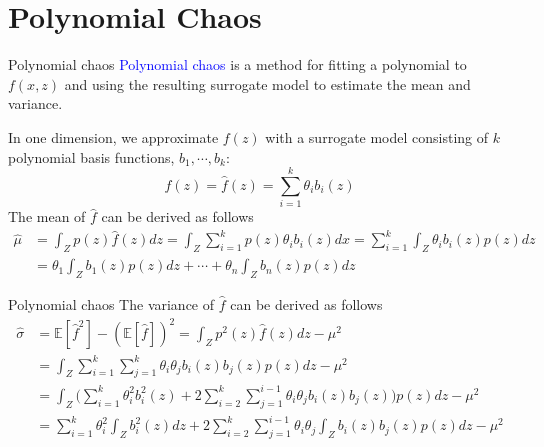 \documentclass{beamer}
\begin{document}
\section{Polynomial Chaos}
\begin{frame}{Polynomial chaos}
\textcolor{blue}{Polynomial chaos} is a method for fitting a polynomial to $f(x, z)$ and using the resulting surrogate model to estimate the mean and variance. 

In one dimension, we approximate $f(z)$ with a surrogate model consisting of $k$ polynomial basis functions, $b_1, \cdots, b_k$:
\begin{equation*}
    f(z) = \hat{f}(z) = \sum_{i=1}^k \theta_i b_i(z)
\end{equation*}
The mean of $\hat{f}$ can be derived as follows
\begin{equation*}
\begin{split}
    \hat{\mu} & = \int_Z p(z)\hat{f}(z) dz = \int_Z \sum_{i=1}^k p(z) \theta_i b_i(z) dx
    = \sum_{i=1}^k \int_Z \theta_i b_i(z) p(z)dz \\
              & = \theta_1 \int_Z b_1(z) p(z)dz + \cdots + \theta_n \int_Z b_n(z) p(z)dz
\end{split}
\end{equation*}
\end{frame}

\begin{frame}{Polynomial chaos}
The variance of $\hat{f}$ can be derived as follows
\begin{equation*}
\begin{split}
    \hat{\sigma} & = \mathbb{E}[\hat{f}^2] - (\mathbb{E}[\hat{f}])^2
    = \int_Z p^2(z)\hat{f}(z) dz - \mu^2\\
    &= \int_Z \sum_{i=1}^k\sum_{j=1}^k  \theta_i\theta_j b_i(z)b_j(z)p(z)dz - \mu^2\\
    & = \int_Z \bigg( \sum_{i=1}^k \theta_i^2 b_i^2(z) + 2\sum_{i=2}^k\sum_{j=1}^{i-1} \theta_i\theta_j b_i(z)b_j(z)\bigg)p(z)dz -\mu^2 \\
    & =  \sum_{i=1}^k \theta_i^2 \int_Z b_i^2(z)dz + 2\sum_{i=2}^k\sum_{j=1}^{i-1} \theta_i\theta_j \int_Z b_i(z)b_j(z)p(z)dz
    - \mu^2
\end{split}
\end{equation*}
\end{frame}
\end{document}
